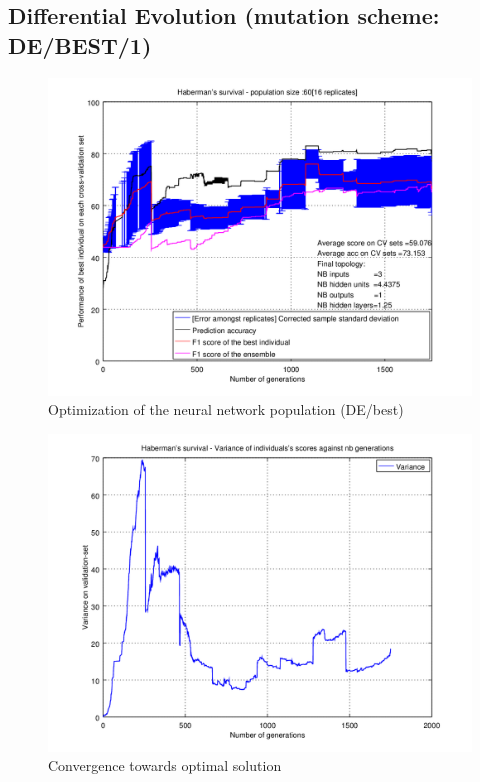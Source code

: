 \documentclass[a4paper,12pt, oneside]{memoir}
\begin{document}
\clearpage

\subsection{Differential Evolution (mutation scheme: DE/BEST/1)}

\begin{figure}[h]
  \centering
  \includegraphics[scale=0.7]{haberman-performancesVSepochs-DE-BEST}
  \vspace{-12pt}
  \caption{Optimization of the neural network population (DE/best)}
  \label{haberman-perfs-de-rand}
\end{figure}

\begin{figure}[h]
  \centering
  \includegraphics[scale=0.7]{haberman-varianceVSepochs-DE-BEST}
  \vspace{-12pt}
  \caption{Convergence towards optimal solution}
  \label{haberman-variance-de-rand}
\end{figure}
\end{document}
